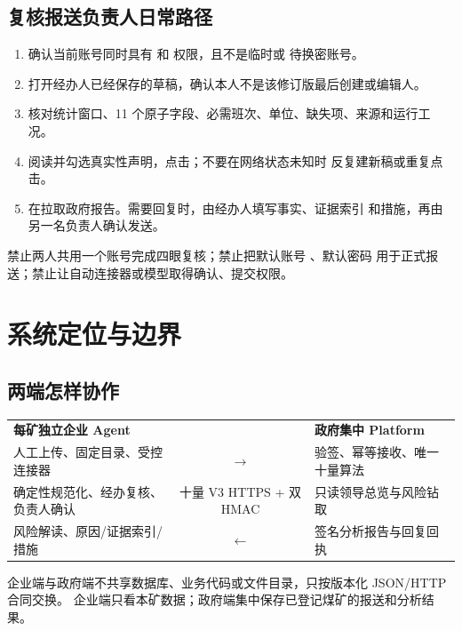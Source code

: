 \documentclass[UTF8,openany,zihao=-4,fontset=none]{ctexbook}
\begin{document}
\section{复核报送负责人日常路径}

\begin{enumerate}
  \item 确认当前账号同时具有  和  权限，且不是临时或
  待换密账号。
  \item 打开经办人已经保存的草稿，确认本人不是该修订版最后创建或编辑人。
  \item 核对统计窗口、11 个原子字段、必需班次、单位、缺失项、来源和运行工况。
  \item 阅读并勾选真实性声明，点击；不要在网络状态未知时
  反复建新稿或重复点击。
  \item 在拉取政府报告。需要回复时，由经办人填写事实、证据索引
  和措施，再由另一名负责人确认发送。
\end{enumerate}

\begin{dangerbox}
禁止两人共用一个账号完成四眼复核；禁止把默认账号 、默认密码
 用于正式报送；禁止让自动连接器或模型取得确认、提交权限。
\end{dangerbox}

\chapter{系统定位与边界}

\section{两端怎样协作}

\begin{center}
\begin{tabularx}{0.95\textwidth}{Y c Y}
\textbf{每矿独立企业 Agent} & & \textbf{政府集中 Platform}\\
人工上传、固定目录、受控连接器 & $\longrightarrow$ & 验签、幂等接收、唯一十量算法\\
确定性规范化、经办复核、负责人确认 & 十量 V3 HTTPS + 双 HMAC & 只读领导总览与风险钻取\\
风险解读、原因/证据索引/措施 & $\longleftarrow$ & 签名分析报告与回复回执\\
\end{tabularx}
\end{center}

企业端与政府端不共享数据库、业务代码或文件目录，只按版本化 JSON/HTTP 合同交换。
企业端只看本矿数据；政府端集中保存已登记煤矿的报送和分析结果。
\end{document}
